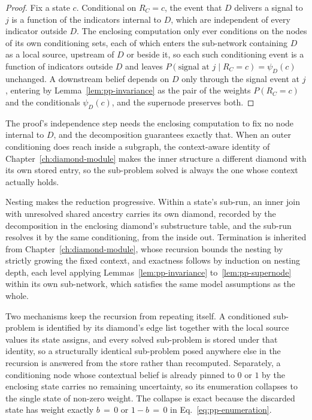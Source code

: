 \documentclass[12pt]{report}
\begin{document}
\begin{proof}
Fix a state $c$. Conditional on $R_C = c$, the event that $D$ delivers a signal to $j$ is a function of the indicators internal to $D$, which are independent of every indicator outside $D$. The enclosing computation only ever conditions on the nodes of its own conditioning sets, each of which enters the sub-network containing $D$ as a local source, upstream of $D$ or beside it, so each such conditioning event is a function of indicators outside $D$ and leaves $P(\text{signal at } j \mid R_C = c) = \psi_D(c)$ unchanged. A downstream belief depends on $D$ only through the signal event at $j$, entering by Lemma~\ref{lem:pp-invariance} as the pair of the weights $P(R_C = c)$ and the conditionals $\psi_D(c)$, and the supernode preserves both.
\end{proof}

The proof's independence step needs the enclosing computation to fix no node internal to $D$, and the decomposition guarantees exactly that. When an outer conditioning does reach inside a subgraph, the context-aware identity of Chapter~\ref{ch:diamond-module} makes the inner structure a different diamond with its own stored entry, so the sub-problem solved is always the one whose context actually holds.

Nesting makes the reduction progressive. Within a state's sub-run, an inner join with unresolved shared ancestry carries its own diamond, recorded by the decomposition in the enclosing diamond's substructure table, and the sub-run resolves it by the same conditioning, from the inside out. Termination is inherited from Chapter~\ref{ch:diamond-module}, whose recursion bounds the nesting by strictly growing the fixed context, and exactness follows by induction on nesting depth, each level applying Lemmas~\ref{lem:pp-invariance} to~\ref{lem:pp-supernode} within its own sub-network, which satisfies the same model assumptions as the whole.

Two mechanisms keep the recursion from repeating itself. A conditioned sub-problem is identified by its diamond's edge list together with the local source values its state assigns, and every solved sub-problem is stored under that identity, so a structurally identical sub-problem posed anywhere else in the recursion is answered from the store rather than recomputed. Separately, a conditioning node whose contextual belief is already pinned to $0$ or $1$ by the enclosing state carries no remaining uncertainty, so its enumeration collapses to the single state of non-zero weight. The collapse is exact because the discarded state has weight exactly $b\,{=}\,0$ or $1 - b\,{=}\,0$ in Eq.~\eqref{eq:pp-enumeration}.
\end{document}

